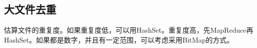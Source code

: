 \documentclass[../../../interview-questions.tex]{subfiles}
\begin{document}
\subsection{大文件去重}

估算文件的重复度。如果重复度低，可以用HashSet。重复度高，先MapReduce再HashSet。如果都是数字，并且有一定范围，可以考虑采用BitMap的方式。
\end{document}
